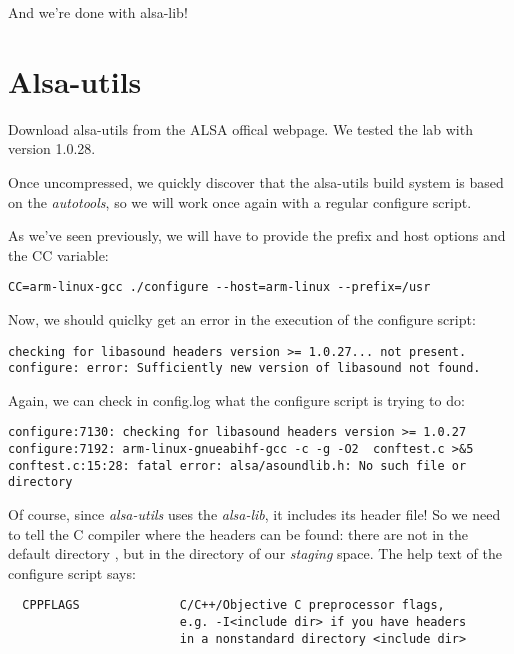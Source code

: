 And we're done with alsa-lib!

\section{Alsa-utils}

Download alsa-utils from the ALSA offical webpage. We tested the lab
with version 1.0.28.

Once uncompressed, we quickly discover that the alsa-utils build
system is based on the {\em autotools}, so we will work once again
with a regular configure script.

As we've seen previously, we will have to provide the prefix and host
options and the CC variable:

\begin{verbatim}
CC=arm-linux-gcc ./configure --host=arm-linux --prefix=/usr
\end{verbatim}

Now, we should quiclky get an error in the execution of the configure
script:

\begin{verbatim}
checking for libasound headers version >= 1.0.27... not present.
configure: error: Sufficiently new version of libasound not found.
\end{verbatim}

Again, we can check in config.log what the configure script is trying
to do:

\footnotesize
\begin{verbatim}
configure:7130: checking for libasound headers version >= 1.0.27
configure:7192: arm-linux-gnueabihf-gcc -c -g -O2  conftest.c >&5
conftest.c:15:28: fatal error: alsa/asoundlib.h: No such file or directory
\end{verbatim}
\normalsize

Of course, since {\em alsa-utils} uses the {\em alsa-lib}, it includes
its header file! So we need to tell the C compiler where the headers
can be found: there are not in the default directory
, but in the  directory of our
{\em staging} space. The help text of the configure script says:

\begin{verbatim}
  CPPFLAGS              C/C++/Objective C preprocessor flags,
                        e.g. -I<include dir> if you have headers
                        in a nonstandard directory <include dir>
\end{verbatim}


